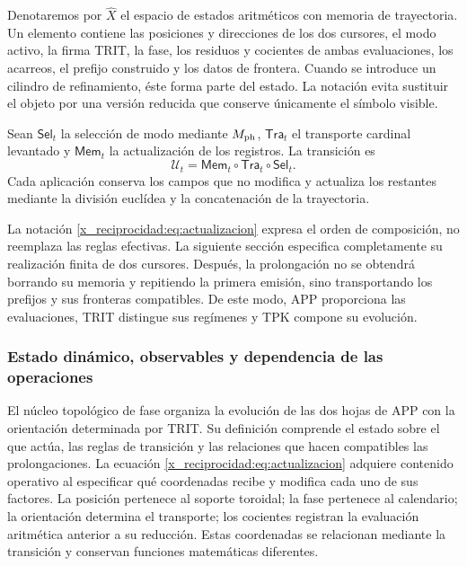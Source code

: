 Denotaremos por \(\widehat X\) el espacio de estados aritméticos con memoria de trayectoria. Un elemento contiene las posiciones y direcciones de los dos cursores, el modo activo, la firma TRIT, la fase, los residuos y cocientes de ambas evaluaciones, los acarreos, el prefijo construido y los datos de frontera. Cuando se introduce un cilindro de refinamiento, éste forma parte del estado. La notación evita sustituir el objeto por una versión reducida que conserve únicamente el símbolo visible.

\begin{definition}
Sean \(\mathsf{Sel}_t\) la selección de modo mediante \(M_{\rm ph}\), \(\mathsf{Tra}_t\) el transporte cardinal levantado y \(\mathsf{Mem}_t\) la actualización de los registros. La transición es
\begin{equation}
 \mathcal U_t=\mathsf{Mem}_t\circ\mathsf{Tra}_t\circ\mathsf{Sel}_t.
 \label{x_reciprocidad:eq:actualizacion}
\end{equation}
Cada aplicación conserva los campos que no modifica y actualiza los restantes mediante la división euclídea y la concatenación de la trayectoria.
\end{definition}

La notación \eqref{x_reciprocidad:eq:actualizacion} expresa el orden de composición, no reemplaza las reglas efectivas. La siguiente sección especifica completamente su realización finita de dos cursores. Después, la prolongación no se obtendrá borrando su memoria y repitiendo la primera emisión, sino transportando los prefijos y sus fronteras compatibles. De este modo, APP proporciona las evaluaciones, TRIT distingue sus regímenes y TPK compone su evolución.



\subsubsection{Estado dinámico, observables y dependencia de las operaciones}
\label{x_reciprocidad:tpk-int:estado}

El núcleo topológico de fase organiza la evolución de las dos hojas de APP
con la orientación determinada por TRIT. Su definición comprende el estado
sobre el que actúa, las reglas de transición y las relaciones que hacen
compatibles las prolongaciones. La ecuación \eqref{x_reciprocidad:eq:actualizacion} adquiere
contenido operativo al especificar qué coordenadas recibe y modifica cada
uno de sus factores. La posición pertenece al soporte toroidal; la fase
pertenece al calendario; la orientación determina el transporte; los
cocientes registran la evaluación aritmética anterior a su reducción.
Estas coordenadas se relacionan mediante la transición y conservan funciones
matemáticas diferentes.

